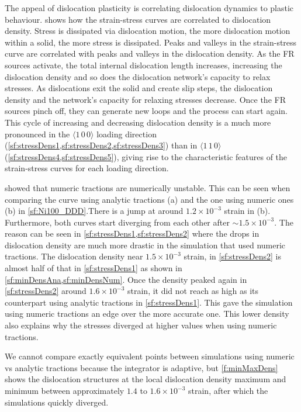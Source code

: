 The appeal of dislocation plasticity is correlating dislocation dynamics to plastic behaviour.  shows how the strain-stress curves are correlated to dislocation density. Stress is dissipated via dislocation motion, the more dislocation motion within a solid, the more stress is dissipated. Peaks and valleys in the strain-stress curve are correlated with peaks and valleys in the dislocation density. As the FR sources activate, the total internal dislocation length increases, increasing the dislocation density and so does the dislocation network's capacity to relax stresses. As dislocations exit the solid and create slip steps, the dislocation density and the network's capacity for relaxing stresses decrease. Once the FR sources pinch off, they can generate new loops and the process can start again. This cycle of increasing and decreasing dislocation density is a much more pronounced in the $\langle 1\, 0\, 0 \rangle$ loading direction (\cref{sf:stressDens1,sf:stressDens2,sf:stressDens3}) than in $\langle 1\, 1\, 0\rangle$ (\cref{sf:stressDens4,sf:stressDens5}), giving rise to the characteristic features of the strain-stress curves for each loading direction.

 showed that numeric tractions are numerically unstable. This can be seen when comparing the curve using analytic tractions (a) and the one using numeric ones (b) in \cref{sf:Ni100_DDD}.There is a jump at around $1.2\times 10^{-3}$ strain in (b). Furthermore, both curves start diverging from each other after $\sim 1.5\times 10^{-3}$. The reason can be seen in \cref{sf:stressDens1,sf:stressDens2} where the drops in dislocation density are much more drastic in the simulation that used numeric tractions. The dislocation density near $1.5\times 10^{-3}$ strain, in \cref{sf:stressDens2} is almost half of that in \cref{sf:stressDens1} as shown in \cref{sf:minDensAna,sf:minDensNum}. Once the density peaked again in \cref{sf:stressDens2} around $1.6\times 10^{-3}$ strain, it did not reach as high as its counterpart using analytic tractions in \cref{sf:stressDens1}. This gave the simulation using numeric tractions an edge over the more accurate one. This lower density also explains why the stresses diverged at higher values when using numeric tractions.

We cannot compare exactly equivalent points between simulations using numeric vs analytic tractions because the integrator is adaptive, but \cref{f:minMaxDens} shows the dislocation structures at the local dislocation density maximum and minimum between approximately $1.4$ to $1.6\times 10^{-3}$ strain, after which the simulations quickly diverged.

